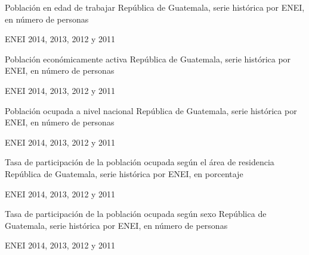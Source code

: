  
 {%
 }%
 {%
 	Población en edad de trabajar} %
 {%
 	República de Guatemala, serie histórica por ENEI, en número de personas} %
 {%
 	\begin{tikzpicture}[x=1pt,y=1pt]    \end{tikzpicture}}%
 {%
 	ENEI 2014, 2013, 2012 y 2011} %
 
 
 
 {%
 }%
 {%
 	Población económicamente activa} %
 {%
 	República de Guatemala, serie histórica por ENEI, en número de personas} %
 {%
 	\begin{tikzpicture}[x=1pt,y=1pt]    \end{tikzpicture}}%
 {%
 	ENEI 2014, 2013, 2012 y 2011} %
 
 
  
  {%
  }%
  {%
  	Población ocupada a nivel nacional} %
  {%
  	República de Guatemala, serie histórica por ENEI, en número de personas} %
  {%
  	\begin{tikzpicture}[x=1pt,y=1pt]    \end{tikzpicture}}%
  {%
  	ENEI 2014, 2013, 2012 y 2011} %
  
  
  
  
  {%
  }%
  {%
  	Tasa de participación de la población ocupada según el área de residencia} %
  {%
  	República de Guatemala, serie histórica por ENEI, en porcentaje} %
  {%
  	\begin{tikzpicture}[x=1pt,y=1pt]    \end{tikzpicture}}%
  {%
  	ENEI 2014, 2013, 2012 y 2011} %
  
  
 
 {%
 }%
 {%
 	Tasa de participación de la población ocupada según sexo} %
 {%
 	República de Guatemala, serie histórica por ENEI, en número de personas} %
 {%
 	\begin{tikzpicture}[x=1pt,y=1pt]    \end{tikzpicture}}%
 {%
 	ENEI 2014, 2013, 2012 y 2011} %
 
